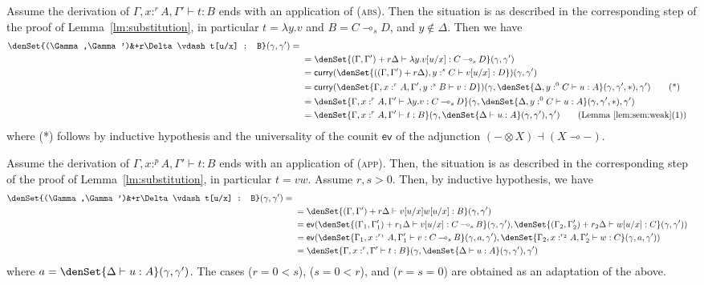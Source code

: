 \documentclass[a4paper,UKenglish,cleveref, autoref, thm-restate]{lipics-v2021}
\newcommand{\lol}{\mathbin{\multimap}}
\newcommand{\mprod}{\otimes}
\newcommand{\ts}{\vdash}
\newcommand{\hastype}[3]{#1\ts #2 : #3}
\newcommand{\curry}{\mathsf{curry}}
\newcommand{\eval}{\mathsf{ev}}
\begin{document}
\begin{description}[font=\sc,wide]
\item[Case (abs):] Assume the derivation of $\hastype{\Gamma, x:^r A,\Gamma'}{t}{B}$ ends with an application of (\textsc{abs}). Then the situation is as described in the corresponding step of the proof of Lemma~\ref{lm:substitution},
in particular $t=\lambda y.v$ and $B = C \lol_s D$, and $y\notin\Delta$.
Then we have
\begin{align*}
\denSet{\hastype{(\Gamma,\Gamma')&+r\Delta}{t[u/x]}{B}}(\gamma,\gamma') = {}\\
&= \denSet{\hastype{(\Gamma,\Gamma')+r\Delta}{\lambda y. v[u/x]}{C \lol_s D}}(\gamma,\gamma') \\
&=\curry(\denSet{\hastype{((\Gamma,\Gamma')+r\Delta),y:^sC}{v[u/x]}{D}})(\gamma,\gamma') \\
&=\curry(\denSet{\hastype{\Gamma,x:^rA,\Gamma',y:^sB}{v}{D}})(\gamma,
\denSet{\hastype{\Delta,y:^0C}{u}{A}}(\gamma,\gamma',*)
,\gamma') \tag{*} \\
&=\denSet{\hastype{\Gamma,x:^rA,\Gamma'}{\lambda y.v}{C \lol_s D}}(\gamma,
\denSet{\hastype{\Delta,y:^0C}{u}{A}}(\gamma,\gamma',*)
,\gamma') \\
&=\denSet{\hastype{\Gamma,x:^rA,\Gamma'}{t}{B}}(\gamma,
\denSet{\hastype{\Delta}{u}{A}}(\gamma,\gamma')
,\gamma') \tag{Lemma~\ref{lem:sem:weak}(1)}
\end{align*}
where (*) follows by inductive hypothesis and the universality of the counit
$\eval$ of the adjunction $(- \mprod X) \dashv (X \lol -)$.

\item[Case (app):] Assume the derivation of $\hastype{\Gamma, x:^p A,\Gamma'}{t}{B}$ ends with an application of (\textsc{app}). Then, the situation is as described in the corresponding step of the proof of Lemma~\ref{lm:substitution},
in particular $t=v w$. Assume $r,s>0$. Then, by inductive hypothesis, we have
\begin{align*}
\denSet{\hastype{(\Gamma,\Gamma')&+r\Delta}{t[u/x]}{B}}(\gamma,\gamma') = {} \\
&= \denSet{\hastype{(\Gamma,\Gamma')+r\Delta}{v[u/x] w[u/x]}{B}}(\gamma,\gamma') \\
&=\eval(\denSet{\hastype{(\Gamma_1,\Gamma'_1)+r_1\Delta}{v[u/x]}{C \lol_s B}}(\gamma,\gamma'), \denSet{\hastype{(\Gamma_2,\Gamma'_2)+r_2\Delta}{w[u/x]}{C}}(\gamma,\gamma')) \\
&=\eval(
\denSet{\hastype{\Gamma_1,x:^{r_1}A,\Gamma'_1}{v}{C \lol_s B}}
(\gamma,a, \gamma'), 
\denSet{\hastype{\Gamma_2,x:^{r_2}A,\Gamma'_2}{w}{C}}
(\gamma,a,\gamma')) \\
&=\denSet{\hastype{\Gamma,x:^r,\Gamma'}{t}{B}}
(\gamma,\denSet{\hastype{\Delta}{u}{A}}(\gamma,\gamma'),\gamma')
\end{align*}
where $a = \denSet{\hastype{\Delta}{u}{A}}(\gamma,\gamma')$.
The cases ($r=0<s$), ($s=0<r$), and ($r=s=0$) are obtained as an adaptation of the above.


\end{description}
\end{document}
